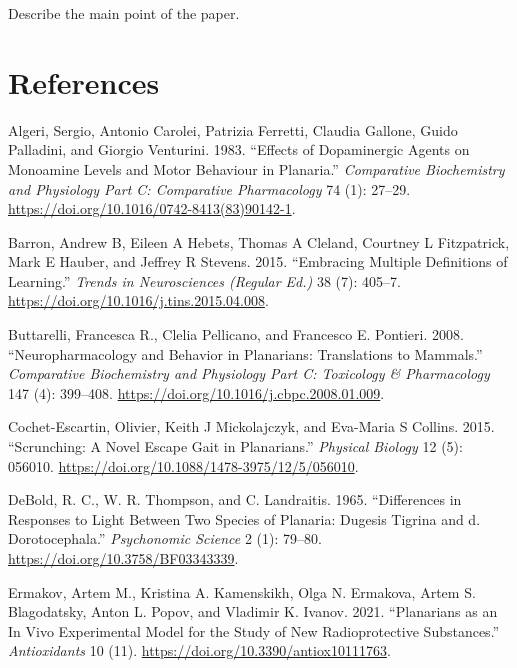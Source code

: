 \documentclass[
  letterpaper,
  DIV=11,
  numbers=noendperiod,
  oneside]{scrartcl}
\newlength{\cslhangindent}
\newenvironment{CSLReferences}[2] %
 {\begin{list}{}{%
  \setlength{\itemindent}{0pt}
  \setlength{\leftmargin}{0pt}
  \setlength{\parsep}{0pt}
  \ifodd #1
   \setlength{\leftmargin}{\cslhangindent}
   \setlength{\itemindent}{-1\cslhangindent}
  \fi
  \setlength{\itemsep}{#2\baselineskip}}}
 {\end{list}}
\begin{document}
Describe the main point of the paper.

\section{References}\label{references}

\label{refs}
\begin{CSLReferences}{1}{0}
Algeri, Sergio, Antonio Carolei, Patrizia Ferretti, Claudia Gallone,
Guido Palladini, and Giorgio Venturini. 1983. {``Effects of Dopaminergic
Agents on Monoamine Levels and Motor Behaviour in Planaria.''}
\emph{Comparative Biochemistry and Physiology Part C: Comparative
Pharmacology} 74 (1): 27--29.
\url{https://doi.org/10.1016/0742-8413(83)90142-1}.

Barron, Andrew B, Eileen A Hebets, Thomas A Cleland, Courtney L
Fitzpatrick, Mark E Hauber, and Jeffrey R Stevens. 2015. {``Embracing
Multiple Definitions of Learning.''} \emph{Trends in Neurosciences
(Regular Ed.)} 38 (7): 405--7.
\url{https://doi.org/10.1016/j.tins.2015.04.008}.

Buttarelli, Francesca R., Clelia Pellicano, and Francesco E. Pontieri.
2008. {``Neuropharmacology and Behavior in Planarians: {Translations} to
Mammals.''} \emph{Comparative Biochemistry and Physiology Part C:
Toxicology \& Pharmacology} 147 (4): 399--408.
\url{https://doi.org/10.1016/j.cbpc.2008.01.009}.

Cochet-Escartin, Olivier, Keith J Mickolajczyk, and Eva-Maria S Collins.
2015. {``Scrunching: A Novel Escape Gait in Planarians.''}
\emph{Physical Biology} 12 (5): 056010.
\url{https://doi.org/10.1088/1478-3975/12/5/056010}.

DeBold, R. C., W. R. Thompson, and C. Landraitis. 1965. {``Differences
in Responses to Light Between Two Species of Planaria: Dugesis Tigrina
and d. Dorotocephala.''} \emph{Psychonomic Science} 2 (1): 79--80.
\url{https://doi.org/10.3758/BF03343339}.

Ermakov, Artem M., Kristina A. Kamenskikh, Olga N. Ermakova, Artem S.
Blagodatsky, Anton L. Popov, and Vladimir K. Ivanov. 2021. {``Planarians
as an {In} {Vivo} {Experimental} {Model} for the {Study} of {New}
{Radioprotective} {Substances}.''} \emph{Antioxidants} 10 (11).
\url{https://doi.org/10.3390/antiox10111763}.


\end{CSLReferences}
\end{document}
